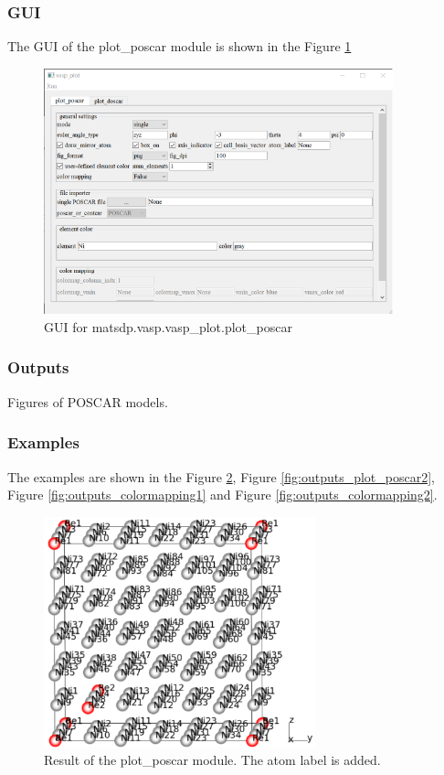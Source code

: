 \documentclass[12pt]{book}
\begin{document}
\subsubsection{GUI}
The GUI of the plot\_poscar module is shown in the Figure \ref{fig:gui_plot_poscar} 
\begin{figure}[htbp]
\centering
\includegraphics[width=0.9\textwidth]{gui_plot_poscar.pdf}
\caption{GUI for matsdp.vasp.vasp\_plot.plot\_poscar}
\label{fig:gui_plot_poscar}
\end{figure}

\subsubsection{Outputs}
Figures of POSCAR models.

\subsubsection{Examples}

The examples are shown in the Figure \ref{fig:outputs_plot_poscar1}, Figure \ref{fig:outputs_plot_poscar2}, Figure \ref{fig:outputs_colormapping1} and Figure \ref{fig:outputs_colormapping2}.

\begin{figure}[htbp]
\centering
\includegraphics[width=0.7\textwidth]{outputs_plot_poscar1.pdf}
\caption{Result of the plot\_poscar module. The atom label is added.}
\label{fig:outputs_plot_poscar1}
\end{figure}
\end{document}
